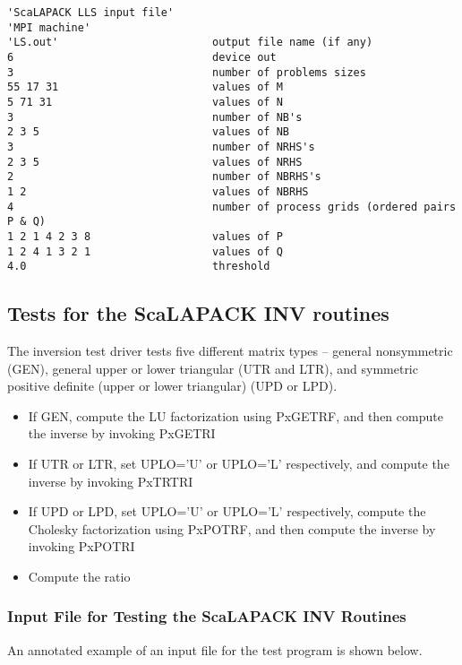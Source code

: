 \documentclass[11pt]{report}
\newcommand{\dent}{\hspace*{\parindent}}
\begin{document}
\begin{verbatim}
'ScaLAPACK LLS input file'
'MPI machine'
'LS.out'                        output file name (if any)
6                               device out
3                               number of problems sizes
55 17 31                        values of M
5 71 31                         values of N
3                               number of NB's
2 3 5                           values of NB
3                               number of NRHS's
2 3 5                           values of NRHS
2                               number of NBRHS's
1 2                             values of NBRHS
4                               number of process grids (ordered pairs P & Q)
1 2 1 4 2 3 8                   values of P
1 2 4 1 3 2 1                   values of Q
4.0                             threshold
\end{verbatim}

\subsection{Tests for the ScaLAPACK INV routines}

The inversion test driver tests five different matrix types -- general
nonsymmetric (GEN), general upper or lower triangular (UTR and LTR),
and symmetric positive definite (upper or lower triangular) (UPD or
LPD).

\begin{itemize}
\item
If GEN, compute the LU factorization using PxGETRF, and then compute the inverse
by invoking PxGETRI
\item
If UTR or LTR, set UPLO='U' or UPLO='L' respectively, and compute the inverse
by invoking PxTRTRI
\item
If UPD or LPD, set UPLO='U' or UPLO='L' respectively, compute the Cholesky
factorization using PxPOTRF, and then compute the inverse by invoking PxPOTRI
\item
Compute the ratio
\end{itemize}

\subsubsection{Input File for Testing the ScaLAPACK INV Routines}
\dent
An annotated example of an input file for the
test program is shown below.
\end{document}
